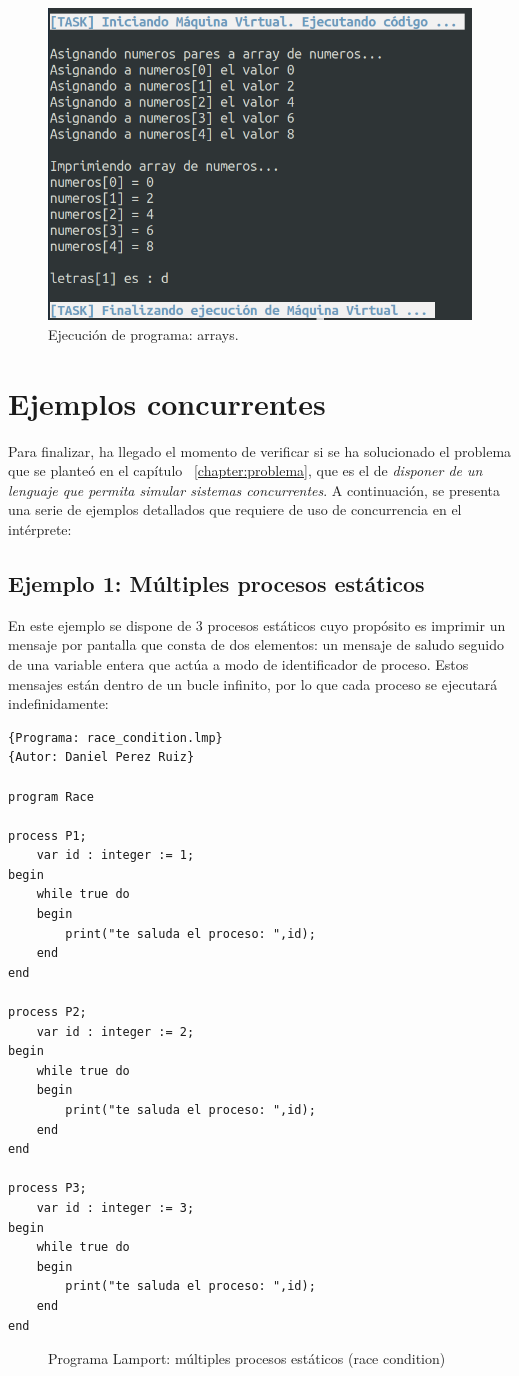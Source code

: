 \newpage
\begin{figure}[h]
    \includegraphics[width=\linewidth]{images/ejemplos/array.png}
    \caption{Ejecución de programa: arrays.}
    \label{fig:lamportArray_exec}
\end{figure}

\section{Ejemplos concurrentes}
Para finalizar, ha llegado el momento de verificar si se ha solucionado el problema que se planteó en el capítulo ~\ref{chapter:problema}, que es el de \textit{disponer de un lenguaje que permita simular sistemas concurrentes}. A continuación, se presenta una serie de ejemplos detallados que requiere de uso de concurrencia en el intérprete:

\subsection{Ejemplo 1: Múltiples procesos estáticos}
En este ejemplo se dispone de 3 procesos estáticos cuyo propósito es imprimir un mensaje por pantalla que consta de dos elementos: un mensaje de saludo seguido de una variable entera que actúa a modo de identificador de proceso. Estos mensajes están dentro de un bucle infinito, por lo que cada proceso se ejecutará indefinidamente:
\begin{lstlisting}[style=lamportStyle]
{Programa: race_condition.lmp}
{Autor: Daniel Perez Ruiz}

program Race

process P1;
	var id : integer := 1;
begin
	while true do
	begin
		print("te saluda el proceso: ",id);
	end
end

process P2;
	var id : integer := 2;
begin
	while true do
	begin
		print("te saluda el proceso: ",id);
	end
end

process P3;
	var id : integer := 3;
begin
	while true do
	begin
		print("te saluda el proceso: ",id);
	end
end
\end{lstlisting}
\begin{figure}[h]
\caption{Programa Lamport: múltiples procesos estáticos (race condition)}
\label{fig:lamportMultipleProcess}
\end{figure}

